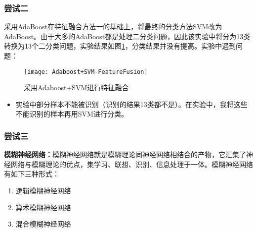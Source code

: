 \subsubsection{尝试二}
采用AdaBoost在特征融合方法一的基础上，将最终的分类方法SVM改为AdaBoost。由于大多的AdaBoost都是处理二分类问题，因此该实验中将分为13类转换为13个二分类问题，实验结果如图\ref{fig:Adaboost+SVM-FeatureFusion}，分类结果并没有提高。实验中遇到问题：
\begin{figure}[!ht]
\centering
\texttt{[image: Adaboost+SVM-FeatureFusion]}
\caption{采用Adaboost+SVM进行特征融合}
\label{fig:Adaboost+SVM-FeatureFusion}
\end{figure}
\begin{itemize}
\item 实验中部分样本不能被识别（识别的结果13类都不是）。在实验中，我将这些不能识别的样本再用SVM进行分类。
\end{itemize}

\subsubsection{尝试三}
\textbf{模糊神经网络：}模糊神经网络就是模糊理论同神经网络相结合的产物，它汇集了神经网络与模糊理论的优点，集学习、联想、识别、信息处理于一体。模糊神经网络有如下三种形式：
\begin{enumerate}
\item 逻辑模糊神经网络
\item 算术模糊神经网络
\item 混合模糊神经网络
\end{enumerate}
